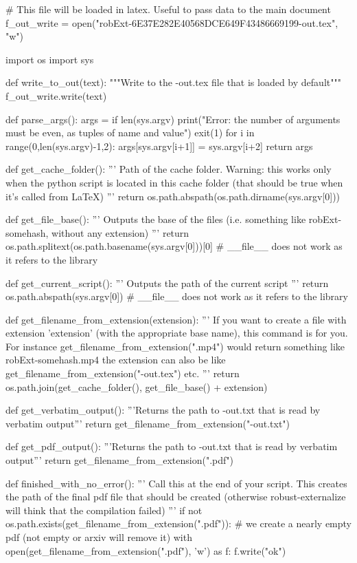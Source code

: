 
# This file will be loaded in latex. Useful to pass data to the main document
f_out_write = open("robExt-6E37E282E40568DCE649F43486669199-out.tex", "w")

import os
import sys

def write_to_out(text):
    """Write to the -out.tex file that is loaded by default"""
    f_out_write.write(text)

def parse_args():
    args = {}
    if len(sys.argv) %
        print("Error: the number of arguments must be even, as tuples of name and value")
        exit(1)
    for i in range(0,len(sys.argv)-1,2):
        args[sys.argv[i+1]] = sys.argv[i+2]
    return args

def get_cache_folder():
    '''
    Path of the cache folder. Warning: this works only when the python script
    is located in this cache folder (that should be true when it's called from LaTeX)
    '''
    return os.path.abspath(os.path.dirname(sys.argv[0]))

def get_file_base():
    '''
    Outputs the base of the files (i.e. something like robExt-somehash, without any extension)
    '''
    return os.path.splitext(os.path.basename(sys.argv[0]))[0] # __file__ does not work as it refers to the library

def get_current_script():
    '''
    Outputs the path of the current script
    '''
    return os.path.abspath(sys.argv[0]) # __file__ does not work as it refers to the library


def get_filename_from_extension(extension):
    '''
    If you want to create a file with extension 'extension' (with the appropriate base name), this command
    is for you. For instance get_filename_from_extension(".mp4") would return something like
    robExt-somehash.mp4
    the extension can also be like get_filename_from_extension("-out.tex") etc.
    '''
    return os.path.join(get_cache_folder(), get_file_base() + extension)

def get_verbatim_output():
    '''Returns the path to -out.txt that is read by verbatim output'''
    return get_filename_from_extension("-out.txt")

def get_pdf_output():
    '''Returns the path to -out.txt that is read by verbatim output'''
    return get_filename_from_extension(".pdf")


def finished_with_no_error():
    '''
    Call this at the end of your script. This creates the path of the final pdf file that should be
    created (otherwise robust-externalize will think that the compilation failed)
    '''
    if not os.path.exists(get_filename_from_extension(".pdf")):
        # we create a nearly empty pdf (not empty or arxiv will remove it)
        with open(get_filename_from_extension(".pdf"), 'w') as f:
            f.write("ok")

